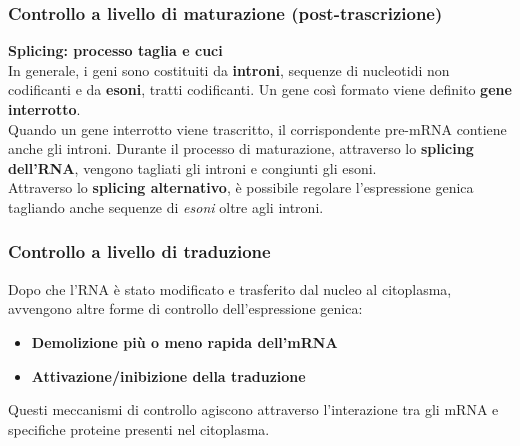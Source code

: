 \documentclass[hyperref={pdfpagelabels=false}]{beamer}
\begin{document}
\begin{frame}\frametitle{Controllo a livello di maturazione (post-trascrizione)}
\textbf{Splicing: processo taglia e cuci}\\
In generale, i geni sono costituiti da \textbf{introni}, sequenze di nucleotidi non codificanti e da \textbf{esoni}, tratti codificanti. Un gene cos\`i formato viene definito \textbf{gene interrotto}.\\
Quando un gene interrotto viene trascritto, il corrispondente pre-mRNA contiene anche gli introni. Durante il processo di maturazione, attraverso lo \textbf{splicing dell'RNA}, vengono tagliati gli introni e congiunti gli esoni.\\
Attraverso lo \textbf{splicing alternativo}, \`e possibile regolare l'espressione genica tagliando anche sequenze di \emph{esoni} oltre agli introni.
\end{frame}

\begin{frame}\frametitle{Controllo a livello di traduzione}
Dopo che l'RNA \`e stato modificato e trasferito dal nucleo al citoplasma, avvengono altre forme di controllo dell'espressione genica:\\

\begin{itemize}
\item \textbf{Demolizione pi\`u o meno rapida dell'mRNA}
\item \textbf{Attivazione/inibizione della traduzione}


\end{itemize}
Questi meccanismi di controllo agiscono attraverso l'interazione tra gli mRNA e specifiche proteine presenti nel citoplasma.\\

\end{frame}
\end{document}
